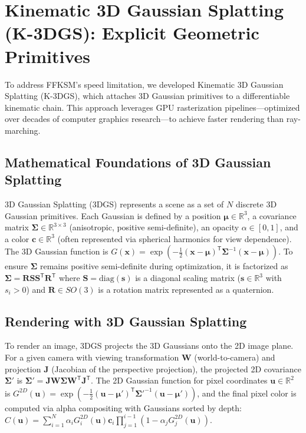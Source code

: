 \documentclass[12pt,a4paper,oneside]{report}
\begin{document}
\section{Kinematic 3D Gaussian Splatting (K-3DGS): Explicit Geometric Primitives}

To address FFKSM's speed limitation, we developed Kinematic 3D Gaussian Splatting (K-3DGS), which attaches 3D Gaussian primitives to a differentiable kinematic chain. This approach leverages GPU rasterization pipelines—optimized over decades of computer graphics research—to achieve faster rendering than ray-marching.

\subsection{Mathematical Foundations of 3D Gaussian Splatting}
\label{subsec:mathematical_foundations_of_3d_gaussian_splatting}

3D Gaussian Splatting (3DGS) represents a scene as a set of $N$ discrete 3D Gaussian primitives. Each Gaussian is defined by a position $\boldsymbol{\mu} \in \mathbb{R}^3$, a covariance matrix $\boldsymbol{\Sigma} \in \mathbb{R}^{3 \times 3}$ (anisotropic, positive semi-definite), an opacity $\alpha \in [0, 1]$, and a color $\mathbf{c} \in \mathbb{R}^3$ (often represented via spherical harmonics for view dependence). The 3D Gaussian function is $G(\mathbf{x}) = \exp\left(-\frac{1}{2} (\mathbf{x} - \boldsymbol{\mu})^\mathsf{T} \boldsymbol{\Sigma}^{-1} (\mathbf{x} - \boldsymbol{\mu})\right)$. To ensure $\boldsymbol{\Sigma}$ remains positive semi-definite during optimization, it is factorized as $\boldsymbol{\Sigma} = \mathbf{R} \mathbf{S} \mathbf{S}^\mathsf{T} \mathbf{R}^\mathsf{T}$ where $\mathbf{S} = \text{diag}(\mathbf{s})$ is a diagonal scaling matrix ($\mathbf{s} \in \mathbb{R}^3$ with $s_i > 0$) and $\mathbf{R} \in SO(3)$ is a rotation matrix represented as a quaternion.

\subsection{Rendering with 3D Gaussian Splatting}
\label{subsec:rendering_with_3d_gaussian_splatting}

To render an image, 3DGS projects the 3D Gaussians onto the 2D image plane. For a given camera with viewing transformation $\mathbf{W}$ (world-to-camera) and projection $\mathbf{J}$ (Jacobian of the perspective projection), the projected 2D covariance $\boldsymbol{\Sigma}'$ is $\boldsymbol{\Sigma}' = \mathbf{J} \mathbf{W} \boldsymbol{\Sigma} \mathbf{W}^\mathsf{T} \mathbf{J}^\mathsf{T}$. The 2D Gaussian function for pixel coordinates $\mathbf{u} \in \mathbb{R}^2$ is $G^{2D}(\mathbf{u}) = \exp\left(-\frac{1}{2} (\mathbf{u} - \boldsymbol{\mu}')^\mathsf{T} \boldsymbol{\Sigma}'^{-1} (\mathbf{u} - \boldsymbol{\mu}')\right)$, and the final pixel color is computed via alpha compositing with Gaussians sorted by depth: $C(\mathbf{u}) = \sum_{i=1}^{N} \alpha_i G_i^{2D}(\mathbf{u}) \mathbf{c}_i \prod_{j=1}^{i-1} (1 - \alpha_j G_j^{2D}(\mathbf{u}))$.
\end{document}
